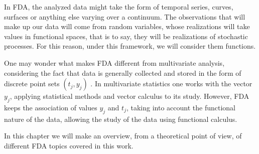 In FDA, the analyzed data might take the form of temporal series, curves,
surfaces or anything else varying over a continuum.  The observations that will
make up our data will come from random variables, whose realizations will take
values in functional spaces, that is to say, they will be realizations of
stochastic processes. For this reason, under this framework, we will consider
them functions.

One may wonder what makes FDA different from multivariate analysis, considering
the fact that data is generally collected and stored in the form of discrete
point sets ${(t_j, y_j)}$ \cite{Srivastava2016}.  In
multivariate statistics one works with the vector ${y_j}$, applying statistical
methods and vector calculus to its study. However, FDA keeps the association of
values ${y_j}$ and ${t_j}$, taking into account the functional nature of the
data, allowing the study of the data using functional calculus.

In this chapter we will make an overview, from a theoretical point of view, of
different FDA topics covered in this work.
